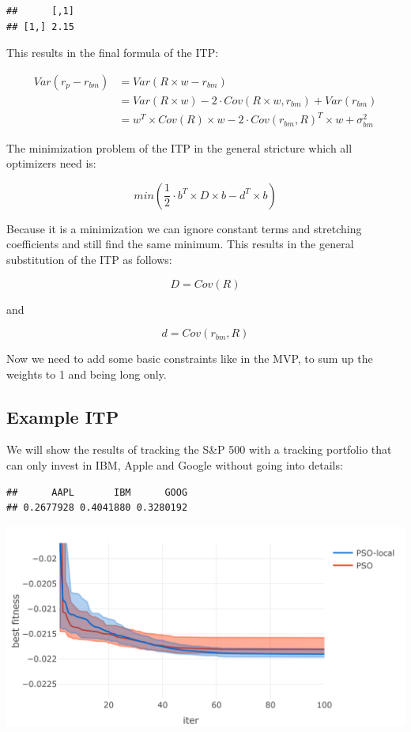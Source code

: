 \documentclass[
  oneside]{book}
\begin{document}
\begin{verbatim}
##      [,1]
## [1,] 2.15
\end{verbatim}

This results in the final formula of the ITP:

\begin{equation}
  \begin{split}
   Var(r_{p}-r_{bm}) & = Var(R \times w - r_{bm}) \\
   & = Var(R \times w) - 2 \cdot Cov(R \times w,r_{bm}) + Var(r_{bm})  \\
   & = w^T \times Cov(R) \times w - 2 \cdot Cov(r_{bm}, R)^T \times w + \sigma_{bm}^2
   \end{split}
   \label{eq:ITP}
\end{equation}

The minimization problem of the ITP in the general stricture which all optimizers need is:

\[
  min(\frac{1}{2} \cdot b^T \times D \times b -d^T \times b)
\]

Because it is a minimization we can ignore constant terms and stretching coefficients and still find the same minimum. This results in the general substitution of the ITP as follows:

\[
  D = Cov(R)
\]

and

\[
d = Cov(r_{bm}, R)
\]

Now we need to add some basic constraints like in the MVP, to sum up the weights to 1 and being long only.

\hypertarget{example-itp}{%
\subsection{Example ITP}\label{example-itp}}

We will show the results of tracking the S\&P 500 with a tracking portfolio that can only invest in IBM, Apple and Google without going into details:

\begin{verbatim}
##      AAPL       IBM      GOOG 
## 0.2677928 0.4041880 0.3280192
\end{verbatim}

\includegraphics{Master_Thesis_files/figure-latex/unnamed-chunk-12-1.png}
\end{document}
